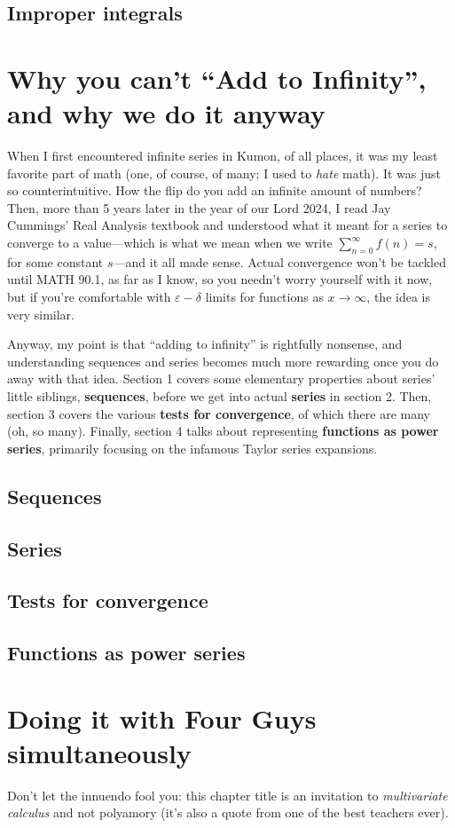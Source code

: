 \documentclass{book}
\begin{document}
\section{Improper integrals}

\chapter{Why you can't ``Add to Infinity'', and why we do it anyway}
When I first encountered infinite series in Kumon, of all places, it was my least favorite part of math (one, of course, of many; I used to \textit{hate} math). 
It was just so counterintuitive. How the flip do you add an infinite amount of numbers? Then, more than 5 years later in the year of our Lord 2024, I read 
Jay Cummings' Real Analysis textbook and understood what it meant for a series to converge to a value---which is what we mean when we write \(\sum_{n=0}^{\infty} f(n) = s\), 
for some constant \(s\)---and it all made sense. Actual convergence won't be tackled until MATH 90.1, as far as I know, so you needn't worry yourself with it now, but if
you're comfortable with \(\varepsilon-\delta\) limits for functions as \(x \to \infty\), the idea is very similar.\par 
Anyway, my point is that ``adding to infinity'' is rightfully nonsense, and understanding sequences and series becomes much more rewarding once you do away 
with that idea. Section 1 covers some elementary properties about series' little siblings, \textbf{sequences}, before we get into actual \textbf{series} in section 2. 
Then, section 3 covers the various \textbf{tests for convergence}, of which there are many (oh, so many). Finally, section 4 talks about representing \textbf{functions as power series},
primarily focusing on the infamous Taylor series expansions.
\section{Sequences} 
\section{Series}
\section{Tests for convergence}
\section{Functions as power series}

\chapter{Doing it with Four Guys simultaneously}
Don't let the innuendo fool you: this chapter title is an invitation to \textit{multivariate calculus} and not polyamory (it's also a quote from one of the best teachers ever).
\end{document}
